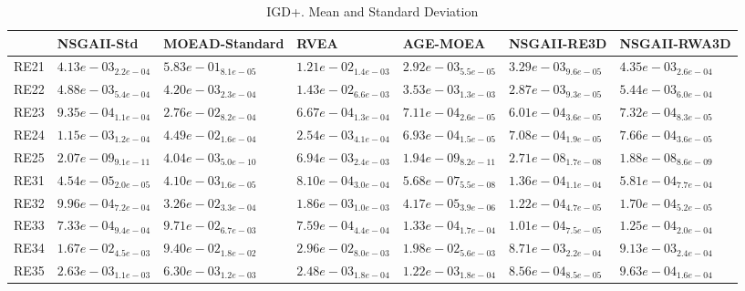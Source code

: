\documentclass{article}
\begin{document}
\begin{table}
\caption{IGD+. Mean and Standard Deviation}
\label{table: IGD+}
\centering
\begin{scriptsize}
\begin{tabular}{lllllll}
\hline & NSGAII-Std & MOEAD-Standard & RVEA & AGE-MOEA & NSGAII-RE3D &  NSGAII-RWA3D\\
\hline 
RE21 & $  4.13e-03_{ 2.2e-04}$ & $  5.83e-01_{ 8.1e-05}$ & $  1.21e-02_{ 1.4e-03}$ & \cellcolor{gray95}$  2.92e-03_{ 5.5e-05}$ & \cellcolor{gray25}$  3.29e-03_{ 9.6e-05}$ & $  4.35e-03_{ 2.6e-04}$ \\
RE22 & $  4.88e-03_{ 5.4e-04}$ & $  4.20e-03_{ 2.3e-04}$ & $  1.43e-02_{ 6.6e-03}$ & \cellcolor{gray25}$  3.53e-03_{ 1.3e-03}$ & \cellcolor{gray95}$  2.87e-03_{ 9.3e-05}$ & $  5.44e-03_{ 6.0e-04}$ \\
RE23 & $  9.35e-04_{ 1.1e-04}$ & $  2.76e-02_{ 8.2e-04}$ & \cellcolor{gray25}$  6.67e-04_{ 1.3e-04}$ & $  7.11e-04_{ 2.6e-05}$ & \cellcolor{gray95}$  6.01e-04_{ 3.6e-05}$ & $  7.32e-04_{ 8.3e-05}$ \\
RE24 & $  1.15e-03_{ 1.2e-04}$ & $  4.49e-02_{ 1.6e-04}$ & $  2.54e-03_{ 4.1e-04}$ & \cellcolor{gray95}$  6.93e-04_{ 1.5e-05}$ & \cellcolor{gray25}$  7.08e-04_{ 1.9e-05}$ & $  7.66e-04_{ 3.6e-05}$ \\
RE25 & \cellcolor{gray25}$  2.07e-09_{ 9.1e-11}$ & $  4.04e-03_{ 5.0e-10}$ & $  6.94e-03_{ 2.4e-03}$ & \cellcolor{gray95}$  1.94e-09_{ 8.2e-11}$ & $  2.71e-08_{ 1.7e-08}$ & $  1.88e-08_{ 8.6e-09}$ \\
RE31 & \cellcolor{gray25}$  4.54e-05_{ 2.0e-05}$ & $  4.10e-03_{ 1.6e-05}$ & $  8.10e-04_{ 3.0e-04}$ & \cellcolor{gray95}$  5.68e-07_{ 5.5e-08}$ & $  1.36e-04_{ 1.1e-04}$ & $  5.81e-04_{ 7.7e-04}$ \\
RE32 & $  9.96e-04_{ 7.2e-04}$ & $  3.26e-02_{ 3.3e-04}$ & $  1.86e-03_{ 1.0e-03}$ & \cellcolor{gray95}$  4.17e-05_{ 3.9e-06}$ & \cellcolor{gray25}$  1.22e-04_{ 4.7e-05}$ & $  1.70e-04_{ 5.2e-05}$ \\
RE33 & $  7.33e-04_{ 9.4e-04}$ & $  9.71e-02_{ 6.7e-03}$ & $  7.59e-04_{ 4.4e-04}$ & $  1.33e-04_{ 1.7e-04}$ & \cellcolor{gray95}$  1.01e-04_{ 7.5e-05}$ & \cellcolor{gray25}$  1.25e-04_{ 2.0e-04}$ \\
RE34 & $  1.67e-02_{ 4.5e-03}$ & $  9.40e-02_{ 1.8e-02}$ & $  2.96e-02_{ 8.0e-03}$ & $  1.98e-02_{ 5.6e-03}$ & \cellcolor{gray95}$  8.71e-03_{ 2.2e-04}$ & \cellcolor{gray25}$  9.13e-03_{ 2.4e-04}$ \\
RE35 & $  2.63e-03_{ 1.1e-03}$ & $  6.30e-03_{ 1.2e-03}$ & $  2.48e-03_{ 1.8e-04}$ & $  1.22e-03_{ 1.8e-04}$ & \cellcolor{gray95}$  8.56e-04_{ 8.5e-05}$ & \cellcolor{gray25}$  9.63e-04_{ 1.6e-04}$ \\

\end{tabular}
\end{scriptsize}
\end{table}
\end{document}
